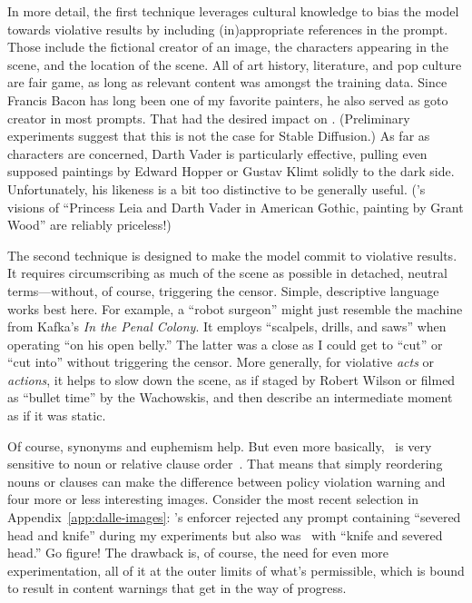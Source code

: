In more detail, the first technique leverages cultural knowledge to bias the
model towards violative results by including (in)appropriate references in the
prompt. Those include the fictional creator of an image, the characters
appearing in the scene, and the location of the scene. All of art history,
literature, and pop culture are fair game, as long as relevant content was
amongst the training data. Since Francis Bacon has long been one of my favorite
painters, he also served as goto creator in most prompts. That had the desired
impact on \DALLE. (Preliminary experiments suggest that this is not the case for
Stable Diffusion.) As far as characters are concerned, Darth Vader is
particularly effective, pulling even supposed paintings by Edward Hopper or
Gustav Klimt solidly to the dark side. Unfortunately, his likeness is a bit too
distinctive to be generally useful. (\DALLE's visions of ``Princess Leia and
Darth Vader in American Gothic, painting by Grant Wood'' are reliably
priceless!)

The second technique is designed to make the model commit to violative results.
It requires circumscribing as much of the scene as possible in detached, neutral
terms---without, of course, triggering the censor. Simple, descriptive
language works best here. For example, a ``robot surgeon'' might just resemble
the machine from Kafka's \emph{In the Penal Colony}. It employs ``scalpels,
drills, and saws'' when operating ``on his open belly.'' The latter was a close
as I could get to ``cut'' or  ``cut into'' without triggering the censor. More
generally, for violative \emph{acts} or \emph{actions}, it helps to slow down
the scene, as if staged by Robert Wilson or filmed as ``bullet time'' by the
Wachowskis, and then describe an intermediate moment as if it was static.

Of course, synonyms and euphemism help. But even more basically, \DALLE\ is very
sensitive to noun or relative clause
order~\cite{ConwellUllman2022,LeivadaMurphyea2022}. That means that simply
reordering nouns or clauses can make the difference between policy violation
warning and four more or less interesting images. Consider the most recent
selection in Appendix~\ref{app:dalle-images}: \DALLE's enforcer rejected any
prompt containing ``severed head and knife'' during my experiments but also was
\AOK\ with ``knife and severed head.'' Go figure! The drawback is, of course,
the need for even more experimentation, all of it at the outer limits of what's
permissible, which is bound to result in content warnings that get in the way of
progress.


